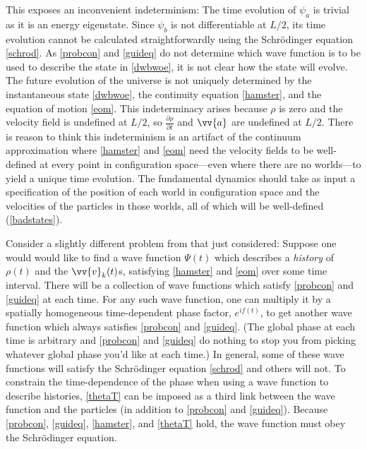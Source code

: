 \documentclass[12pt,secnumarabic,balancelastpage,amsmath,amssymb,nofootinbib]{article}
\begin{document}
This exposes an inconvenient indeterminism: The time evolution of $\psi_a$ is trivial as it is an energy eigenstate.  Since $\psi_b$ is not differentiable at $L/2$, its time evolution cannot be calculated straightforwardly using the Schr\"{o}dinger equation \eqref{schrod}.  As  \eqref{probcon} and \eqref{guideq} do not determine which wave function is to be used to describe the state in \eqref{dwbwoe}, it is not clear how the state will evolve.  The future evolution of the universe is not uniquely determined by the instantaneous state \eqref{dwbwoe}, the continuity equation \eqref{hamster}, and the equation of motion \eqref{eom}.  This indeterminacy arises because $\rho$ is zero and the velocity field is undefined at $L/2$, so $\frac{\partial \rho}{\partial t}$ and $\vv{a}$ are undefined at $L/2$.  There is reason to think this indeterminism is an artifact of the continuum approximation where \eqref{hamster} and \eqref{eom} need the velocity fields to be well-defined at every point in configuration space---even where there are no worlds---to yield a unique time evolution. The fundamental dynamics should take as input a specification of the position of each world in configuration space and the velocities of the particles in those worlds, all of which will be well-defined (\textsection \ref{badstates}).

Consider a slightly different problem from that just considered: Suppose one would would like to find a wave function $\Psi(t)$ which describes a \emph{history} of $\rho(t)$ and the $\vv{v}_k(t)$s, satisfying \eqref{hamster} and \eqref{eom} over some time interval.  There will be a collection of wave functions which satisfy \eqref{probcon} and \eqref{guideq} at each time.  For any such wave function, one can multiply it by a spatially homogeneous time-dependent phase factor, $e^{if(t)}$, to get another wave function which always satisfies \eqref{probcon} and \eqref{guideq}.  (The global phase at each time is arbitrary and \eqref{probcon} and \eqref{guideq} do nothing to stop you from picking whatever global phase you'd like at each time.)  In general, some of these wave functions will satisfy the Schr\"{odinger} equation \eqref{schrod} and others will not.  To constrain the time-dependence of the phase when using a wave function to describe histories, \eqref{thetaT} can be imposed as a third link between the wave function and the particles (in addition to \eqref{probcon} and \eqref{guideq}).  Because \eqref{probcon}, \eqref{guideq}, \eqref{hamster}, and \eqref{thetaT} hold, the wave function must obey the Schr\"{o}dinger equation.
\end{document}
